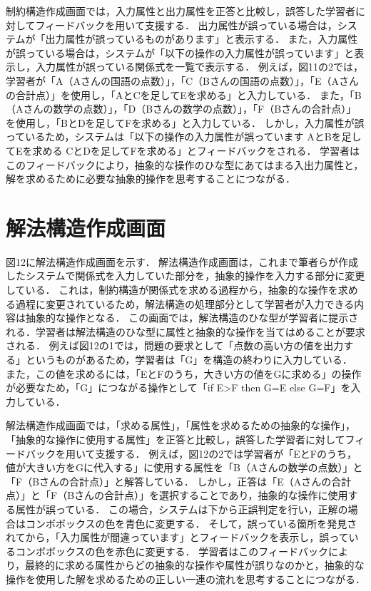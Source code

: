 制約構造作成画面では，入力属性と出力属性を正答と比較し，誤答した学習者に対してフィードバックを用いて支援する．
出力属性が誤っている場合は，システムが「出力属性が誤っているものがあります」と表示する．
また，入力属性が誤っている場合は，システムが「以下の操作の入力属性が誤っています」と表示し，入力属性が誤っている関係式を一覧で表示する．
例えば，図11の2では，学習者が「A（Aさんの国語の点数）」，「C（Bさんの国語の点数）」，「E（Aさんの合計点）」を使用し，「AとCを足してEを求める」と入力している．
また，「B（Aさんの数学の点数）」，「D（Bさんの数学の点数）」，「F（Bさんの合計点）」を使用し，「BとDを足してFを求める」と入力している．
しかし，入力属性が誤っているため，システムは「以下の操作の入力属性が誤っています AとBを足してEを求める CとDを足してFを求める」とフィードバックをされる．
学習者はこのフィードバックにより，抽象的な操作のひな型にあてはまる入出力属性と，解を求めるために必要な抽象的操作を思考することにつながる．

\newpage


\section{解法構造作成画面}
図12に解法構造作成画面を示す．
解法構造作成画面は，これまで筆者らが作成したシステムで関係式を入力していた部分を，抽象的操作を入力する部分に変更している．
これは，制約構造が関係式を求める過程から，抽象的な操作を求める過程に変更されているため，解法構造の処理部分として学習者が入力できる内容は抽象的な操作となる．
この画面では，解法構造のひな型が学習者に提示される．学習者は解法構造のひな型に属性と抽象的な操作を当てはめることが要求される．
例えば図12の1では，問題の要求として「点数の高い方の値を出力する」というものがあるため，学習者は「G」を構造の終わりに入力している．
また，この値を求めるには，「EとFのうち，大きい方の値をGに求める」の操作が必要なため，「G」につながる操作として「if E>F then G=E else G=F」を入力している．

解法構造作成画面では，「求める属性」，「属性を求めるための抽象的な操作」，「抽象的な操作に使用する属性」を正答と比較し，誤答した学習者に対してフィードバックを用いて支援する．
例えば，図12の2では学習者が「EとFのうち，値が大きい方をGに代入する」に使用する属性を「B（Aさんの数学の点数）」と「F（Bさんの合計点）」と解答している．
しかし，正答は「E（Aさんの合計点）」と「F（Bさんの合計点）」を選択することであり，抽象的な操作に使用する属性が誤っている．
この場合，システムは下から正誤判定を行い，正解の場合はコンボボックスの色を青色に変更する．
そして，誤っている箇所を発見されてから，「入力属性が間違っています」とフィードバックを表示し，誤っているコンボボックスの色を赤色に変更する．
学習者はこのフィードバックにより，最終的に求める属性からどの抽象的な操作や属性が誤りなのかと，抽象的な操作を使用した解を求めるための正しい一連の流れを思考することにつながる．

